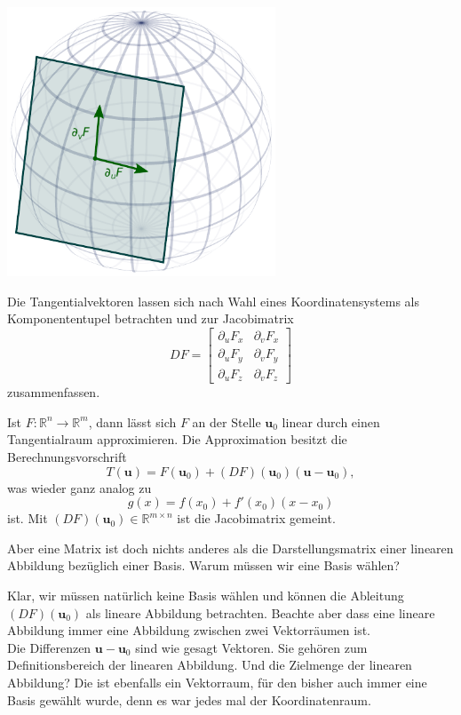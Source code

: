 \documentclass{beamer}
\newcommand{\R}{\mathbb R}
\begin{document}
\begin{frame}
\begin{center}
\includegraphics[width=0.6\textwidth]{img/Tangentialebene.pdf}
\end{center}
\end{frame}

\begin{frame}
Die Tangentialvektoren lassen sich nach Wahl eines
Koordinatensystems als Komponententupel betrachten und
zur Jacobimatrix
\[DF = \begin{bmatrix}
\partial_u F_x & \partial_v F_x\\
\partial_u F_y & \partial_v F_y\\
\partial_u F_z & \partial_v F_z
\end{bmatrix}\]
zusammenfassen.
\end{frame}

\begin{frame}
Ist $F\colon\R^n\to\R^m$, dann lässt sich $F$ an der Stelle
$\mathbf u_0$ linear durch einen Tangentialraum approximieren.
Die Approximation besitzt die Berechnungsvorschrift
\[T(\mathbf u) = F(\mathbf u_0)+(DF)(\mathbf u_0)(\mathbf u-\mathbf u_0),\]
was wieder ganz analog zu
\[g(x) = f(x_0)+f'(x_0)(x-x_0)\]
ist. Mit $(DF)(\mathbf u_0)\in\R^{m\times n}$ ist die Jacobimatrix
gemeint.
\end{frame}

\begin{frame}
Aber eine Matrix ist doch nichts anderes als die Darstellungsmatrix
einer linearen Abbildung bezüglich einer Basis. Warum müssen wir eine
Basis wählen?
\end{frame}

\begin{frame}
Klar, wir müssen natürlich keine Basis wählen und können die
Ableitung $(DF)(\mathbf u_0)$ als lineare Abbildung betrachten. Beachte aber
dass eine lineare Abbildung immer eine Abbildung zwischen zwei
Vektorräumen ist.\\[1em]
Die Differenzen $\mathbf u-\mathbf u_0$ sind wie gesagt Vektoren.
Sie gehören zum Definitionsbereich der linearen Abbildung. Und die
Zielmenge der linearen Abbildung? Die ist ebenfalls ein Vektorraum,
für den bisher auch immer eine Basis gewählt wurde, denn es war
jedes mal der Koordinatenraum.
\end{frame}
\end{document}
